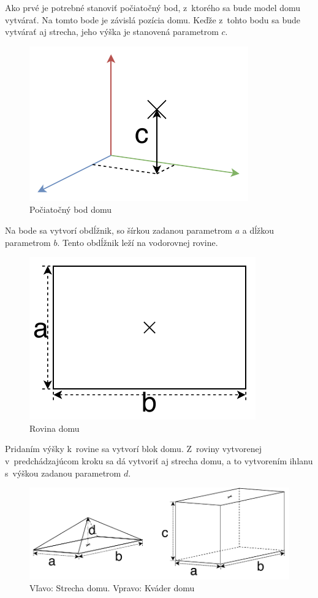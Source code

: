 Ako prvé je potrebné  stanoviť počiatočný bod, z~ktorého sa bude model domu vytvárať. Na tomto bode je závislá pozícia domu. Keďže z~tohto bodu sa bude vytvárať aj strecha, jeho výška je stanovená parametrom $c$.\nopagebreak
\begin{figure}[H]
	\centering
	\includegraphics[height=0.3\textwidth]{obrazky-figures/Examples/B1.pdf}
	\caption{Počiatočný bod domu}
	\label{fig:B1}
\end{figure}
Na bode sa vytvorí obdĺžnik, so šírkou zadanou parametrom $a$ a dĺžkou parametrom $b$. Tento obdĺžnik leží na vodorovnej rovine.\nopagebreak
\begin{figure}[H]
	\centering
	\includegraphics[height=0.3\textwidth]{obrazky-figures/Examples/B2.pdf}
	\caption{Rovina domu}
	\label{fig:B2}
\end{figure}
Pridaním výšky k~rovine sa vytvorí blok domu. Z~roviny vytvorenej v~predchádzajúcom kroku sa dá vytvoriť aj strecha domu, a to vytvorením ihlanu s~výškou zadanou parametrom $d$. \nopagebreak
\begin{figure}[H]
	\centering
	\includegraphics[height=0.3\textwidth]{obrazky-figures/Examples/B3.pdf}
	\caption{Vľavo: Strecha domu. Vpravo: Kváder domu}
	\label{fig:B3}
\end{figure}

